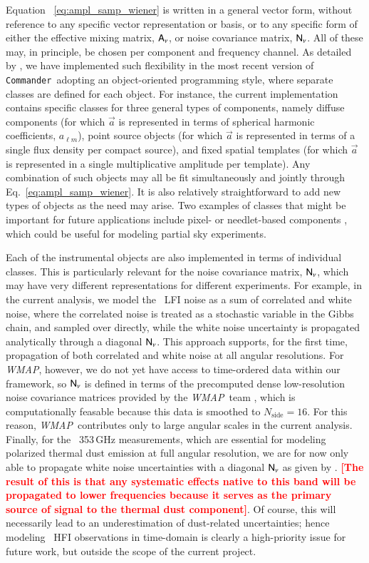 \documentclass[twocolumn]{aa}
\def\WMAP{\textit{WMAP}}
\def\nside{N_{\mathrm{side}}}
\def\commander{\texttt{Commander}}
\newcommand{\A}[0]{\tens{A}}
\renewcommand{\a}[0]{\vec{a}}
\newcommand{\N}[0]{\tens{N}}
\newcommand{\?}[1]{\textcolor{red}{{\bf [#1]}}}
\begin{document}
Equation ~\eqref{eq:ampl_samp_wiener} is written in a general vector
form, without reference to any specific vector representation or
basis, or to any specific form of either the effective mixing matrix,
$\A_{\nu}$, or noise covariance matrix, $\N_{\nu}$. All of these may,
in principle, be chosen per component and frequency channel. As
detailed by \citet{bp03}, we have implemented such flexibility in the
most recent version of \commander\ adopting an object-oriented
programming style, where separate classes are defined for each
object. For instance, the current implementation contains specific
classes for three general types of components, namely diffuse
components (for which $\a$ is represented in terms of spherical
harmonic coefficients, $a_{\ell m}$), point source objects (for which
$\a$ is represented in terms of a single flux density per compact
source), and fixed spatial templates (for which $\a$ is represented in
a single multiplicative amplitude per template). Any combination of
such objects may all be fit simultaneously and jointly through
Eq.~\eqref{eq:ampl_samp_wiener}. It is also relatively straightforward
to add new types of objects as the need may arise. Two examples of
classes that might be important for future applications include pixel-
or needlet-based components \citep[e.g.,][]{marinucci:2008}, which
could be useful for modeling partial sky experiments.

Each of the instrumental objects are also implemented in terms of individual
classes. This is particularly relevant for the noise covariance matrix,
$\N_{\nu}$, which may have very different representations for different
experiments. For example, in the current analysis, we model the \Planck\ LFI
noise as a sum of correlated and white noise, where the correlated noise is
treated as a stochastic variable in the Gibbs chain, and sampled over directly,
while the white noise uncertainty is propagated analytically through a diagonal
$\N_{\nu}$. This approach supports, for the first time, propagation of both
correlated and white noise at all angular resolutions. For \WMAP, however, we do
not yet have access to time-ordered data within our framework, so $\N_{\nu}$ is
defined in terms of the precomputed dense low-resolution noise covariance
matrices provided by the \WMAP\ team \citep{bennett2012}, which is
computationally feasable because this data is smoothed to $\nside=16$. For this
reason, \WMAP\ contributes only to large angular scales in the current analysis.
Finally, for the \Planck\ 353\,GHz measurements, which are essential for
modeling polarized thermal dust emission at full angular resolution, we are for
now only able to propagate white noise uncertainties with a diagonal $\N_{\nu}$
as given by \citet{planck2020-LVII}. \textbf{\?{The result of this is that any
systematic effects native to this band will be propagated to lower frequencies
because it serves as the primary source of signal to the thermal dust
component}}. Of course, this will necessarily lead to an underestimation of
dust-related uncertainties; hence modeling \Planck\ HFI observations in
time-domain is clearly a high-priority issue for future work, but outside the
scope of the current project.
\end{document}
